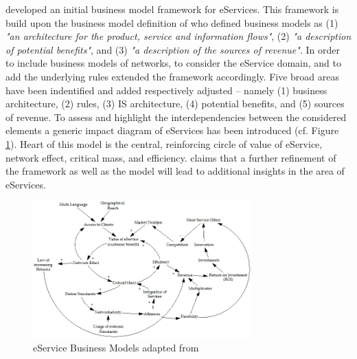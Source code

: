 \citet{Klueber2000} developed an initial business model framework for eServices. This framework is build upon the business model definition of \citet[p. 4]{Timmers1998} who defined business models as (1) \textit{"an architecture for the product, service and information flows"}, (2) \textit{"a description of potential benefits"}, and (3) \textit{"a description of the sources of revenue"}. In order to include business models of networks, to consider the eService domain, and to add the underlying rules \citet{Klueber2000} extended the framework accordingly. Five broad areas have been indentified and added respectively adjusted -- namely (1) business architecture, (2) rules, (3) \ac{IS} architecture, (4) potential benefits, and (5) sources of revenue. To assess and highlight the interdependencies between the considered elements a generic impact diagram of eServices has been introduced (cf. Figure \ref{fig:cld_kl}). Heart of this model is the central, reinforcing circle of value of eService, network effect, critical mass, and efficiency. \citet{Klueber2000} claims that a further refinement of the framework as well as the model will lead to additional insights in the area of eServices. 

\begin{figure}[tb]
	\centering
	\includegraphics[width=0.75\textwidth]{gfx/cld_klueber}
	\caption[eService Business Models]{eService Business Models adapted from \citet[p. 798]{Klueber2000}}
	\label{fig:cld_kl}
\end{figure}

